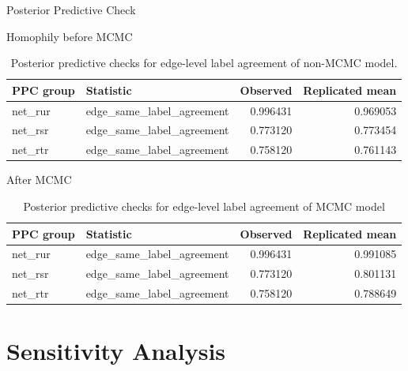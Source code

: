 \documentclass[10pt]{beamer}
\begin{document}
\begin{frame}{Posterior Predictive Check}

Homophily before MCMC

    \begin{table}[ht]
\centering
\begin{tabular}{llrr}
\toprule
\textbf{PPC group} & \textbf{Statistic} & \textbf{Observed} & \textbf{Replicated mean} \\
\midrule
net\_rur & edge\_same\_label\_agreement & 0.996431 & 0.969053 \\
net\_rsr & edge\_same\_label\_agreement & 0.773120 & 0.773454 \\
net\_rtr & edge\_same\_label\_agreement & 0.758120 & 0.761143 \\
\bottomrule
\end{tabular}
\caption{Posterior predictive checks for edge-level label agreement of non-MCMC model.}
\label{tab:ppc_edge_checks}
\end{table}

After MCMC

    \begin{table}[ht]
\centering
\begin{tabular}{llrr}
\toprule
\textbf{PPC group} & \textbf{Statistic} & \textbf{Observed} & \textbf{Replicated mean} \\
\midrule
net\_rur & edge\_same\_label\_agreement & 0.996431 & 0.991085 \\
net\_rsr & edge\_same\_label\_agreement & 0.773120 & 0.801131 \\
net\_rtr & edge\_same\_label\_agreement & 0.758120 & 0.788649 \\
\bottomrule
\end{tabular}
\caption{Posterior predictive checks for edge-level label agreement of MCMC model}
\label{tab:ppc_edge_checks}
\end{table}
\end{frame}

\section{Sensitivity Analysis}
\end{document}
